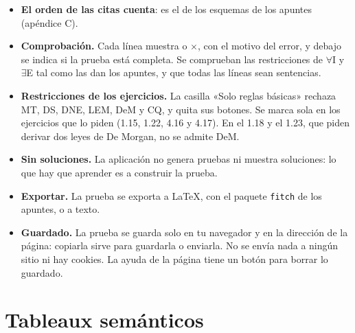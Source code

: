 \documentclass[a4paper,spanish,11pt]{article}
\begin{document}
\begin{itemize}
    \item \textbf{El orden de las citas cuenta}: es el de los esquemas de los apuntes (apéndice C).
    \item \textbf{Comprobación.} Cada línea muestra \checkmark{} o $\times$, con el motivo del error, y debajo se indica si la prueba está completa. Se comprueban las restricciones de $\forall$I y $\exists$E tal como las dan los apuntes, y que todas las líneas sean sentencias.
    \item \textbf{Restricciones de los ejercicios.} La casilla «Solo reglas básicas» rechaza MT, DS, DNE, LEM, DeM y CQ, y quita sus botones. Se marca sola en los ejercicios que lo piden (1.15, 1.22, 4.16 y 4.17). En el 1.18 y el 1.23, que piden derivar dos leyes de De Morgan, no se admite DeM.
    \item \textbf{Sin soluciones.} La aplicación no genera pruebas ni muestra soluciones: lo que hay que aprender es a construir la prueba.
    \item \textbf{Exportar.} La prueba se exporta a \LaTeX{}, con el paquete \texttt{fitch} de los apuntes, o a texto.
    \item \textbf{Guardado.} La prueba se guarda solo en tu navegador y en la dirección de la página: copiarla sirve para guardarla o enviarla. No se envía nada a ningún sitio ni hay cookies. La ayuda de la página tiene un botón para borrar lo guardado.
\end{itemize}

\section{Tableaux semánticos}
\end{document}
